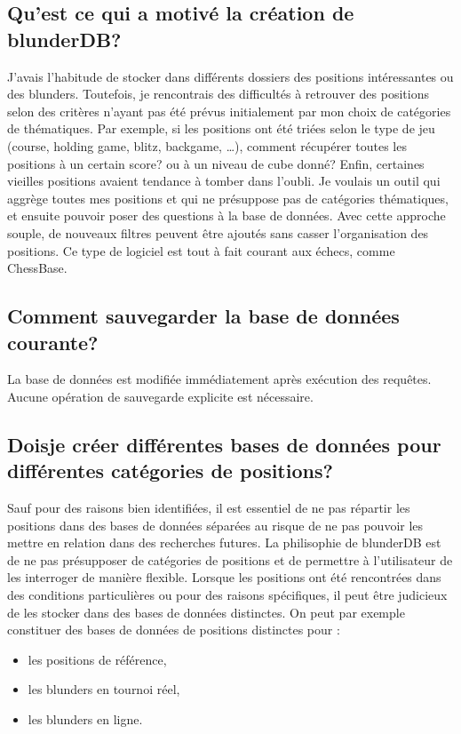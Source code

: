 \documentclass[letterpaper,10pt,french]{sphinxmanual}
\begin{document}
\subsection{Qu’est ce qui a motivé la création de blunderDB?}
\label{\detokenize{faq:qu-est-ce-qui-a-motive-la-creation-de-blunderdb}}
\sphinxAtStartPar
J’avais l’habitude de stocker dans différents dossiers des positions
intéressantes ou des blunders. Toutefois, je rencontrais des difficultés à
retrouver des positions selon des critères n’ayant pas été prévus initialement
par mon choix de catégories de thématiques. Par exemple, si les positions ont
été triées selon le type de jeu (course, holding game, blitz, backgame, …),
comment récupérer toutes les positions à un certain score? ou à un niveau de
cube donné? Enfin, certaines vieilles positions avaient tendance à tomber dans
l’oubli. Je voulais un outil qui aggrège toutes mes positions et qui ne
présuppose pas  de catégories thématiques, et ensuite pouvoir poser
des questions à la base de données. Avec cette approche souple, de nouveaux
filtres peuvent être ajoutés sans casser l’organisation des positions. Ce type
de logiciel est tout à fait courant aux échecs, comme ChessBase.


\subsection{Comment sauvegarder la base de données courante?}
\label{\detokenize{faq:comment-sauvegarder-la-base-de-donnees-courante}}
\sphinxAtStartPar
La base de données est modifiée immédiatement après exécution des requêtes.
Aucune opération de sauvegarde explicite est nécessaire.


\subsection{Dois\sphinxhyphen{}je créer différentes bases de données pour différentes catégories de positions?}
\label{\detokenize{faq:dois-je-creer-differentes-bases-de-donnees-pour-differentes-categories-de-positions}}
\sphinxAtStartPar
Sauf pour des raisons bien identifiées, il est essentiel de ne pas
répartir les positions dans des bases de données séparées au risque
de ne pas pouvoir les mettre en relation dans des recherches futures.
La philisophie de blunderDB est de ne pas présupposer de catégories de
positions  et de permettre à l’utilisateur de les interroger
de manière flexible. Lorsque les positions ont été rencontrées dans des conditions
particulières ou pour des raisons spécifiques, il peut être judicieux de les
stocker dans des bases de données distinctes.
On peut par exemple constituer des bases de données de positions distinctes
pour :
\begin{itemize}
\item {} 
\sphinxAtStartPar
les positions de référence,

\item {} 
\sphinxAtStartPar
les blunders en tournoi réel,

\item {} 
\sphinxAtStartPar
les blunders en ligne.

\end{itemize}
\end{document}
